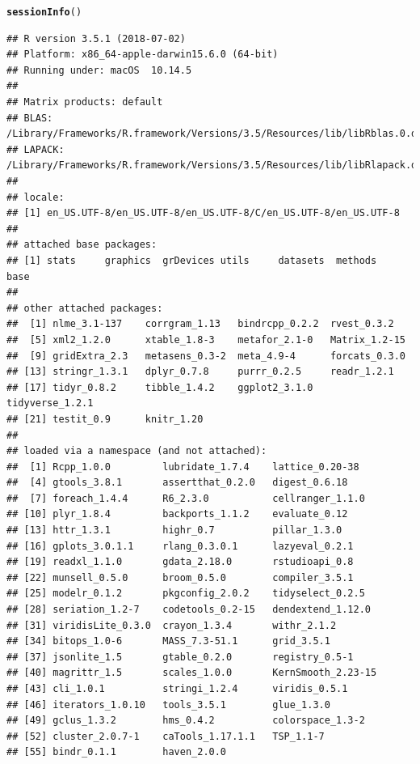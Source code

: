 \documentclass[11pt,a4paper,twoside]{book}\usepackage[]{graphicx}\usepackage[]{color}
\makeatletter
\newcommand{\hlstd}[1]{\textcolor[rgb]{0.345,0.345,0.345}{#1}}%
\newcommand{\hlkwd}[1]{\textcolor[rgb]{0.737,0.353,0.396}{\textbf{#1}}}%
\newenvironment{kframe}{%
 \def\at@end@of@kframe{}%
 \ifinner\ifhmode%
  \def\at@end@of@kframe{\end{minipage}}%
  \begin{minipage}{\columnwidth}%
 \fi\fi%
 \def\FrameCommand##1{\hskip\@totalleftmargin \hskip-\fboxsep
 \colorbox{shadecolor}{##1}\hskip-\fboxsep
     \hskip-\linewidth \hskip-\@totalleftmargin \hskip\columnwidth}%
 \MakeFramed {\advance\hsize-\width
   \@totalleftmargin\z@ \linewidth\hsize
   \@setminipage}}%
 {\par\unskip\endMakeFramed%
 \at@end@of@kframe}
\newenvironment{knitrout}{}{} %
\makeatother
\begin{document}
\begin{knitrout}
\color{fgcolor}\begin{kframe}
\begin{alltt}
\hlkwd{sessionInfo}\hlstd{()}
\end{alltt}
\begin{verbatim}
## R version 3.5.1 (2018-07-02)
## Platform: x86_64-apple-darwin15.6.0 (64-bit)
## Running under: macOS  10.14.5
## 
## Matrix products: default
## BLAS: /Library/Frameworks/R.framework/Versions/3.5/Resources/lib/libRblas.0.dylib
## LAPACK: /Library/Frameworks/R.framework/Versions/3.5/Resources/lib/libRlapack.dylib
## 
## locale:
## [1] en_US.UTF-8/en_US.UTF-8/en_US.UTF-8/C/en_US.UTF-8/en_US.UTF-8
## 
## attached base packages:
## [1] stats     graphics  grDevices utils     datasets  methods   base     
## 
## other attached packages:
##  [1] nlme_3.1-137    corrgram_1.13   bindrcpp_0.2.2  rvest_0.3.2    
##  [5] xml2_1.2.0      xtable_1.8-3    metafor_2.1-0   Matrix_1.2-15  
##  [9] gridExtra_2.3   metasens_0.3-2  meta_4.9-4      forcats_0.3.0  
## [13] stringr_1.3.1   dplyr_0.7.8     purrr_0.2.5     readr_1.2.1    
## [17] tidyr_0.8.2     tibble_1.4.2    ggplot2_3.1.0   tidyverse_1.2.1
## [21] testit_0.9      knitr_1.20     
## 
## loaded via a namespace (and not attached):
##  [1] Rcpp_1.0.0         lubridate_1.7.4    lattice_0.20-38   
##  [4] gtools_3.8.1       assertthat_0.2.0   digest_0.6.18     
##  [7] foreach_1.4.4      R6_2.3.0           cellranger_1.1.0  
## [10] plyr_1.8.4         backports_1.1.2    evaluate_0.12     
## [13] httr_1.3.1         highr_0.7          pillar_1.3.0      
## [16] gplots_3.0.1.1     rlang_0.3.0.1      lazyeval_0.2.1    
## [19] readxl_1.1.0       gdata_2.18.0       rstudioapi_0.8    
## [22] munsell_0.5.0      broom_0.5.0        compiler_3.5.1    
## [25] modelr_0.1.2       pkgconfig_2.0.2    tidyselect_0.2.5  
## [28] seriation_1.2-7    codetools_0.2-15   dendextend_1.12.0 
## [31] viridisLite_0.3.0  crayon_1.3.4       withr_2.1.2       
## [34] bitops_1.0-6       MASS_7.3-51.1      grid_3.5.1        
## [37] jsonlite_1.5       gtable_0.2.0       registry_0.5-1    
## [40] magrittr_1.5       scales_1.0.0       KernSmooth_2.23-15
## [43] cli_1.0.1          stringi_1.2.4      viridis_0.5.1     
## [46] iterators_1.0.10   tools_3.5.1        glue_1.3.0        
## [49] gclus_1.3.2        hms_0.4.2          colorspace_1.3-2  
## [52] cluster_2.0.7-1    caTools_1.17.1.1   TSP_1.1-7         
## [55] bindr_0.1.1        haven_2.0.0
\end{verbatim}
\end{kframe}
\end{knitrout}
\end{document}
